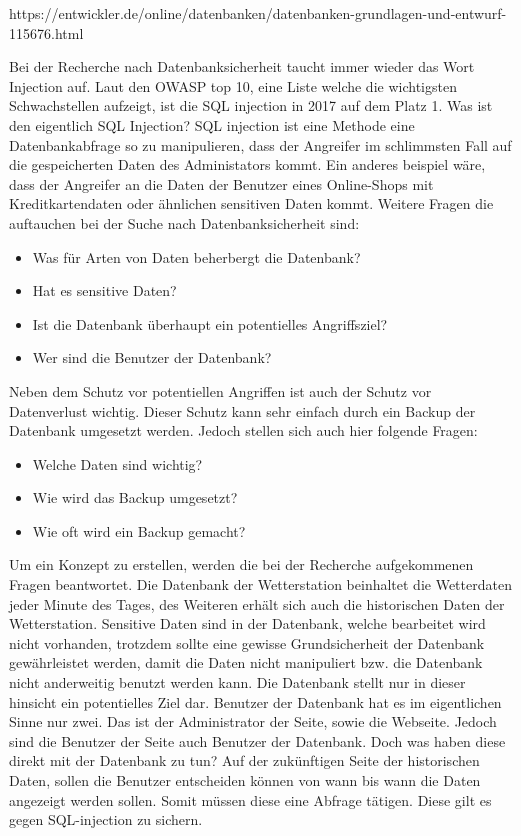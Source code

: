 https://entwickler.de/online/datenbanken/datenbanken-grundlagen-und-entwurf-115676.html

Bei der Recherche nach Datenbanksicherheit taucht immer wieder das Wort Injection auf. Laut den OWASP top 10, eine Liste welche die wichtigsten Schwachstellen aufzeigt, ist die SQL injection in 2017 auf dem Platz 1. Was ist den eigentlich SQL Injection? SQL injection ist eine Methode eine Datenbankabfrage so zu manipulieren, dass der Angreifer im schlimmsten Fall auf die gespeicherten Daten des Administators kommt. Ein anderes beispiel wäre, dass der Angreifer an die Daten der Benutzer eines Online-Shops mit Kreditkartendaten oder ähnlichen sensitiven Daten kommt.
Weitere Fragen die auftauchen bei der Suche nach Datenbanksicherheit sind:
\begin{itemize}
\item Was für Arten von Daten beherbergt die Datenbank?
\item Hat es sensitive Daten?
\item Ist die Datenbank überhaupt ein potentielles Angriffsziel?
\item Wer sind die Benutzer der Datenbank?
\end{itemize}
Neben dem Schutz vor potentiellen Angriffen ist auch der Schutz vor Datenverlust wichtig. Dieser Schutz kann sehr einfach durch ein Backup der Datenbank umgesetzt werden. Jedoch stellen sich auch hier folgende Fragen:
\begin{itemize}
\item Welche Daten sind wichtig?
\item Wie wird das Backup umgesetzt?
\item Wie oft wird ein Backup gemacht?
\end{itemize}

Um ein Konzept zu erstellen, werden die bei der Recherche aufgekommenen Fragen beantwortet. Die Datenbank der Wetterstation beinhaltet die Wetterdaten jeder Minute des Tages, des Weiteren erhält sich auch die historischen Daten der Wetterstation. Sensitive Daten sind in der Datenbank, welche bearbeitet wird nicht vorhanden, trotzdem sollte eine gewisse Grundsicherheit der Datenbank gewährleistet werden, damit die Daten nicht manipuliert bzw. die Datenbank nicht anderweitig benutzt werden kann. Die Datenbank stellt nur in dieser hinsicht ein potentielles Ziel dar. Benutzer der Datenbank hat es im eigentlichen Sinne nur zwei. Das ist der Administrator der Seite, sowie die Webseite. Jedoch sind die Benutzer der Seite auch Benutzer der Datenbank. Doch was haben diese direkt mit der Datenbank zu tun? Auf der zukünftigen Seite der historischen Daten, sollen die Benutzer entscheiden können von wann bis wann die Daten angezeigt werden sollen. Somit müssen diese eine Abfrage tätigen. Diese gilt es gegen SQL-injection zu sichern.

